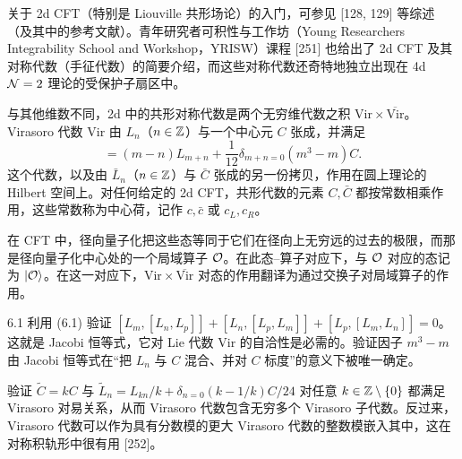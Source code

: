 关于 2d CFT（特别是 Liouville 共形场论）的入门，可参见 [128, 129] 等综述（及其中的参考文献）。青年研究者可积性与工作坊（Young Researchers Integrability School and Workshop，YRISW）课程 [251] 也给出了 2d CFT 及其对称代数（手征代数）的简要介绍，而这些对称代数还奇特地独立出现在 4d $\mathcal{N}=2$ 理论的受保护子扇区中。

 与其他维数不同，2d 中的共形对称代数是两个无穷维代数之积 $\mathrm{Vir}\times\overline{\mathrm{Vir}}$。Virasoro 代数 $\mathrm{Vir}$ 由 $L_n$（$n\in\mathbb{Z}$）与一个中心元 $C$ 张成，并满足
\begin{equation}
  [L_m,L_n] = (m-n)L_{m+n}+\frac{1}{12}\delta_{m+n=0}(m^3-m)C.
  \tag{6.1}
\end{equation}
这个代数，以及由 $\bar L_n$（$n\in\mathbb{Z}$）与 $\bar C$ 张成的另一份拷贝，作用在圆上理论的 Hilbert 空间上。对任何给定的 2d CFT，共形代数的元素 $C,\bar C$ 都按常数相乘作用，这些常数称为中心荷，记作 $c,\bar c$ 或 $c_L,c_R$。

在 CFT 中，径向量子化把这些态等同于它们在径向上无穷远的过去的极限，而那是径向量子化中心处的一个局域算子 $\mathcal{O}$。在此态--算子对应下，与 $\mathcal{O}$ 对应的态记为 $|\mathcal{O}\rangle$。在这一对应下，$\mathrm{Vir}\times\overline{\mathrm{Vir}}$ 对态的作用翻译为通过交换子对局域算子的作用。

\begin{exercise}{6.1}
利用 (6.1) 验证 $[L_m,[L_n,L_p]]+[L_n,[L_p,L_m]]+[L_p,[L_m,L_n]]=0$。这就是 Jacobi 恒等式，它对 Lie 代数 $\mathrm{Vir}$ 的自洽性是必需的。验证因子 $m^3-m$ 由 Jacobi 恒等式在“把 $L_n$ 与 $C$ 混合、并对 $C$ 标度”的意义下被唯一确定。

验证 $\tilde C=kC$ 与 $\tilde L_n=L_{kn}/k+\delta_{n=0}(k-1/k)C/24$ 对任意 $k\in\mathbb{Z}\setminus\{0\}$ 都满足 Virasoro 对易关系，从而 Virasoro 代数包含无穷多个 Virasoro 子代数。反过来，Virasoro 代数可以作为具有分数模的更大 Virasoro 代数的整数模嵌入其中，这在对称积轨形中很有用 [252]。
\end{exercise}


